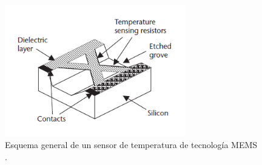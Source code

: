 \begin{itemize}
\begin{itemize}
            \begin{figure}[H]
                \centering
                \includegraphics[width = 0.7\textwidth]{imagenes/cap1_marcoteo/TempMEMS.png}
                \caption{Esquema general de un sensor de temperatura de tecnología MEMS \citep{dunn2005introduction}.}
                \label{fig:temp-MEMS}
            \end{figure}
        \end{itemize}


\end{itemize}
